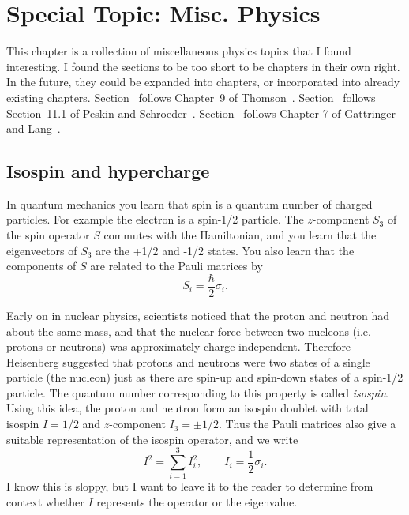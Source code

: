 \chapter{Special Topic: Misc. Physics}\label{ap:spec_phys}
This chapter is a collection of miscellaneous physics topics that I
found interesting. I found the sections to be too short to be
chapters in their own right. In the future, they could be expanded
into chapters, or incorporated into already existing chapters.
Section~ follows Chapter~9 of 
Thomson~\cite{thomson_modern_2013}. 
Section~ follows Section~11.1 of Peskin and 
Schroeder~\cite{peskin_introduction_1995}.
Section~ follows Chapter 7 of Gattringer and 
Lang~\cite{gattringer_quantum_2010}. 

\section{Isospin and hypercharge}\label{sec:isohyper}
In quantum mechanics you learn that spin is a quantum number of
charged particles. For example the electron is a spin-1/2 particle. The
$z$-component $S_3$ of the spin operator $S$ commutes with the Hamiltonian, and
you learn that the eigenvectors of $S_3$ are the +1/2 and -1/2 states. You also
learn that the components of $S$ are related to the Pauli matrices by
\begin{equation}
  S_i=\frac{\hbar}{2}\sigma_i.
\end{equation}

Early on in nuclear physics, scientists noticed that the proton and neutron had
about the same mass, and that the nuclear force between two nucleons (i.e.
protons or neutrons) was approximately charge independent. Therefore Heisenberg
suggested that protons and neutrons were two states of a single particle (the
nucleon) just as there are spin-up and spin-down states of a spin-1/2
particle.
The quantum number corresponding to this property is called {\it isospin}.
Using this idea, the proton and neutron form an isospin doublet with total
isospin $I=1/2$ and $z$-component $I_3=\pm1/2$. Thus the Pauli matrices also
give a suitable representation of the isospin operator, and we write
\begin{equation}
  I^2=\sum\limits_{i=1}^3 I_i^2, \qquad I_i=\frac{1}{2}\sigma_i.
\end{equation}
I know this is sloppy, but I want to leave it to the reader to determine from
context whether $I$ represents the operator or the eigenvalue. 

